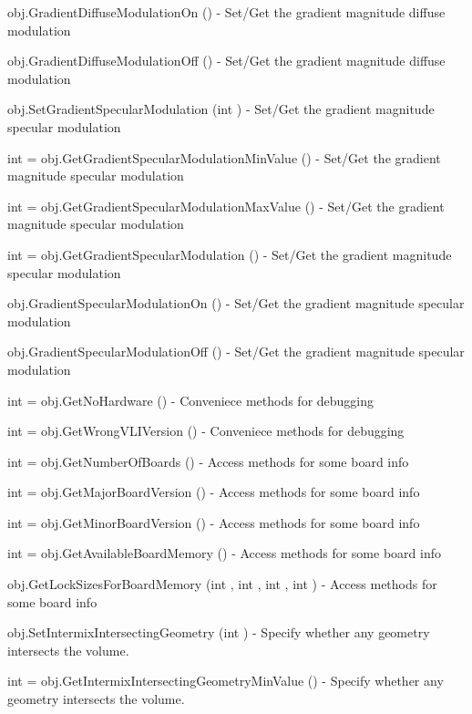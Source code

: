 \begin{DoxyItemize}
\item {\ttfamily obj.\-Gradient\-Diffuse\-Modulation\-On ()} -\/ Set/\-Get the gradient magnitude diffuse modulation  
\item {\ttfamily obj.\-Gradient\-Diffuse\-Modulation\-Off ()} -\/ Set/\-Get the gradient magnitude diffuse modulation  
\item {\ttfamily obj.\-Set\-Gradient\-Specular\-Modulation (int )} -\/ Set/\-Get the gradient magnitude specular modulation  
\item {\ttfamily int = obj.\-Get\-Gradient\-Specular\-Modulation\-Min\-Value ()} -\/ Set/\-Get the gradient magnitude specular modulation  
\item {\ttfamily int = obj.\-Get\-Gradient\-Specular\-Modulation\-Max\-Value ()} -\/ Set/\-Get the gradient magnitude specular modulation  
\item {\ttfamily int = obj.\-Get\-Gradient\-Specular\-Modulation ()} -\/ Set/\-Get the gradient magnitude specular modulation  
\item {\ttfamily obj.\-Gradient\-Specular\-Modulation\-On ()} -\/ Set/\-Get the gradient magnitude specular modulation  
\item {\ttfamily obj.\-Gradient\-Specular\-Modulation\-Off ()} -\/ Set/\-Get the gradient magnitude specular modulation  
\item {\ttfamily int = obj.\-Get\-No\-Hardware ()} -\/ Conveniece methods for debugging  
\item {\ttfamily int = obj.\-Get\-Wrong\-V\-L\-I\-Version ()} -\/ Conveniece methods for debugging  
\item {\ttfamily int = obj.\-Get\-Number\-Of\-Boards ()} -\/ Access methods for some board info  
\item {\ttfamily int = obj.\-Get\-Major\-Board\-Version ()} -\/ Access methods for some board info  
\item {\ttfamily int = obj.\-Get\-Minor\-Board\-Version ()} -\/ Access methods for some board info  
\item {\ttfamily int = obj.\-Get\-Available\-Board\-Memory ()} -\/ Access methods for some board info  
\item {\ttfamily obj.\-Get\-Lock\-Sizes\-For\-Board\-Memory (int , int , int , int )} -\/ Access methods for some board info  
\item {\ttfamily obj.\-Set\-Intermix\-Intersecting\-Geometry (int )} -\/ Specify whether any geometry intersects the volume.  
\item {\ttfamily int = obj.\-Get\-Intermix\-Intersecting\-Geometry\-Min\-Value ()} -\/ Specify whether any geometry intersects the volume.  

\end{DoxyItemize}
